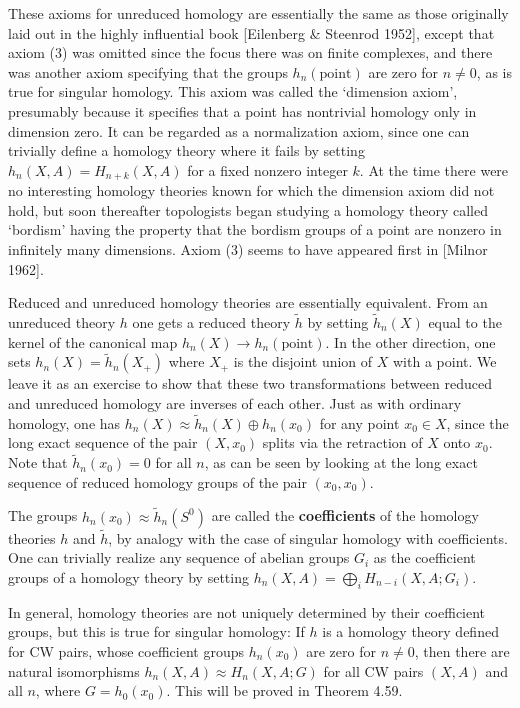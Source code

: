These axioms for unreduced homology are essentially the same as those originally laid out in the highly influential book [Eilenberg \& Steenrod 1952], except that axiom (3) was omitted since the focus there was on finite complexes, and there was another axiom specifying that the groups $h_n(\text{point})$ are zero for $n \neq 0$, as is true for singular homology. This axiom was called the `dimension axiom', presumably because it specifies that a point has nontrivial homology only in dimension zero. It can be regarded as a normalization axiom, since one can trivially define a homology theory where it fails by setting $h_n(X, A) = H_{n+k}(X, A)$ for a fixed nonzero integer $k$. At the time there were no interesting homology theories known for which the dimension axiom did not hold, but soon thereafter topologists began studying a homology theory called `bordism' having the property that the bordism groups of a point are nonzero in infinitely many dimensions. Axiom (3) seems to have appeared first in [Milnor 1962].

Reduced and unreduced homology theories are essentially equivalent. From an unreduced theory $h$ one gets a reduced theory $\tilde{h}$ by setting $\tilde{h}_n(X)$ equal to the kernel of the canonical map $h_n(X) \to h_n(\text{point})$. In the other direction, one sets $h_n(X) = \tilde{h}_n(X_+)$ where $X_+$ is the disjoint union of $X$ with a point. We leave it as an exercise to show that these two transformations between reduced and unreduced homology are inverses of each other. Just as with ordinary homology, one has $h_n(X) \approx \tilde{h}_n(X) \oplus h_n(x_0)$ for any point $x_0 \in X$, since the long exact sequence of the pair $(X, x_0)$ splits via the retraction of $X$ onto $x_0$. Note that $\tilde{h}_n(x_0) = 0$ for all $n$, as can be seen by looking at the long exact sequence of reduced homology groups of the pair $(x_0, x_0)$.

The groups $h_n(x_0) \approx \tilde{h}_n(S^0)$ are called the \textbf{coefficients} of the homology theories $h$ and $\tilde{h}$, by analogy with the case of singular homology with coefficients. One can trivially realize any sequence of abelian groups $G_i$ as the coefficient groups of a homology theory by setting $h_n(X, A) = \bigoplus_i H_{n-i}(X, A; G_i)$.

In general, homology theories are not uniquely determined by their coefficient groups, but this is true for singular homology: If $h$ is a homology theory defined for CW pairs, whose coefficient groups $h_n(x_0)$ are zero for $n \neq 0$, then there are natural isomorphisms $h_n(X, A) \approx H_n(X, A; G)$ for all CW pairs $(X, A)$ and all $n$, where $G = h_0(x_0)$. This will be proved in Theorem 4.59.

